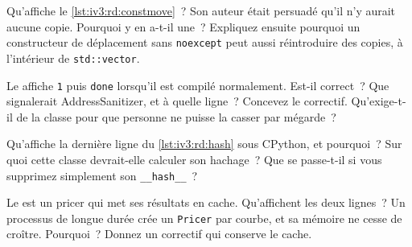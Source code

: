 \begin{question}\label{iq:iv3:reading-debugging-and-software-design:16}
Qu'affiche le \cref{lst:iv3:rd:constmove}~? Son auteur était persuadé qu'il n'y aurait aucune copie. Pourquoi y en a-t-il une~? Expliquez ensuite pourquoi un constructeur de déplacement sans \texttt{noexcept} peut aussi réintroduire des copies, à l'intérieur de \texttt{std::vector}.
\label{lst:iv3:rd:constmove}
\end{question}

\begin{question}\label{iq:iv3:reading-debugging-and-software-design:17}
Le  affiche \texttt{1} puis \texttt{done} lorsqu'il est compilé normalement. Est-il correct~? Que signalerait AddressSanitizer, et à quelle ligne~? Concevez le correctif. Qu'exige-t-il de la classe pour que personne ne puisse la casser par mégarde~?
\label{lst:iv3:rd:callback}
\end{question}

\begin{question}\label{iq:iv3:reading-debugging-and-software-design:18}
Qu'affiche la dernière ligne du \cref{lst:iv3:rd:hash} sous CPython, et pourquoi~? Sur quoi cette classe devrait-elle calculer son hachage~? Que se passe-t-il si vous supprimez simplement son \texttt{\_\_hash\_\_}~?
\label{lst:iv3:rd:hash}
\end{question}

\begin{question}\label{iq:iv3:reading-debugging-and-software-design:19}
Le  est un pricer qui met ses résultats en cache. Qu'affichent les deux lignes~? Un processus de longue durée crée un \texttt{Pricer} par courbe, et sa mémoire ne cesse de croître. Pourquoi~? Donnez un correctif qui conserve le cache.
\label{lst:iv3:rd:cache}
\end{question}

